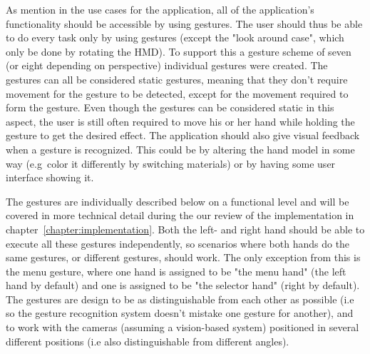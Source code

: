 
As mention in the use cases for the application, all of the application's functionality should be accessible by using gestures. The user should thus
be able to do every task only by using gestures (except the "look around case", which only be done by rotating the HMD). To support this a gesture scheme of seven (or eight depending
on perspective) individual gestures were created. The gestures can all be considered static gestures, meaning that they don't require movement for the gesture to be detected, 
except for the movement required to form the gesture. 
Even though the gestures can be considered static in this aspect, the user is still often required to move his or her hand while holding the gesture to get the desired effect. 
The application should also give visual feedback when a gesture is recognized. This could be by altering the hand model in some way (e.g~color it differently by
switching materials) or by having some user interface showing it. 


The gestures are individually described below on a functional level and will be covered in more technical detail during the our review of the implementation in chapter~\ref{chapter:implementation}. 
Both the left- and right hand should be able to execute all these gestures independently, so scenarios where both hands do the same gestures, or different gestures, should
work. The only exception from this is the menu gesture, where one hand is assigned to be "the menu hand" (the left hand by default) and one is assigned to be "the selector hand"
(right by default). The gestures are design to be as distinguishable from each other as possible (i.e so the gesture recognition system doesn't mistake one gesture for
another), and to work with the cameras (assuming a vision-based system) positioned in several different positions (i.e also distinguishable from different angles).

 
